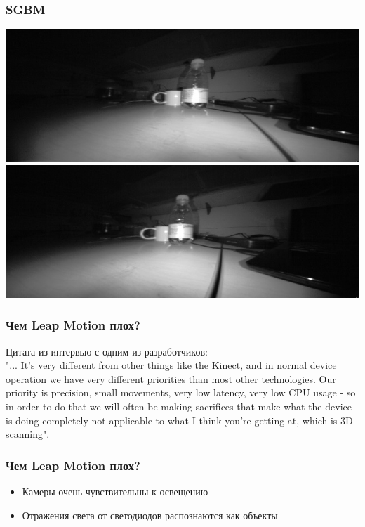 \documentclass{beamer}
\begin{document}
		\begin{frame}
		    \frametitle{SGBM}
		   
		    \begin{center}
				\includegraphics[scale=0.4]{images/raw0}
				\includegraphics[scale=0.4]{images/raw1}
			\end{center}
		\end{frame}
		\begin{frame}
			\frametitle{Чем Leap Motion плох?}
			
			Цитата из интервью с одним из разработчиков:\\
			"... It’s very different from other things like the Kinect, and in
			normal device
			operation we have very different priorities than most other technologies.
			Our priority is precision, small movements, very low latency, very low CPU
			usage - so in order to do that we will often be making sacrifices that make
			what the device is doing completely not applicable to what I think you’re
			getting at, which is 3D scanning".
		\end{frame}
		
		\begin{frame}
			\frametitle{Чем Leap Motion плох?}
			
			\begin{itemize}
				\item Камеры очень чувствительны к освещению
				\item Отражения света от светодиодов распознаются как объекты
			\end{itemize}
		\end{frame}
		
\end{document}
